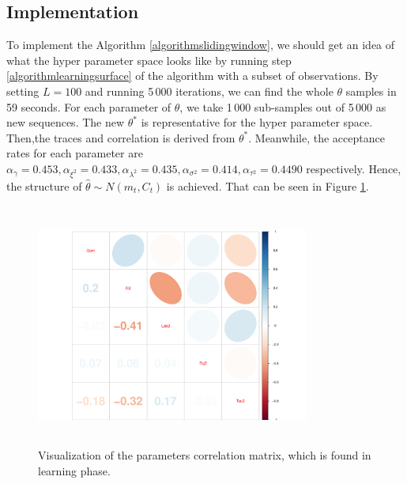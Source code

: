 \subsection{Implementation}

To implement the Algorithm \ref{algorithmslidingwindow}, we should get an idea of what the hyper parameter space looks like by running step \ref{algorithmlearningsurface} of the algorithm with a subset of observations. By setting $L=100$ and running 5\,000 iterations, we can find the whole $\theta$ samples in 59 seconds. For each parameter of $\theta$, we take 1\,000 sub-samples out of 5\,000 as new sequences. The new $\theta^*$ is representative for the hyper parameter space. Then,the traces and correlation is derived from $\theta^*$. Meanwhile, the acceptance rates for each parameter are $\alpha_\gamma = 0.453,\alpha_{\xi^2}=0.433, \alpha_{\lambda^2}=0.435, \alpha_{\sigma^2}=0.414, \alpha_{\tau^2}=0.4490$ respectively. Hence, the structure of  $\hat{\theta}\sim N\left( m_t,C_t\right)$ is achieved. That can be seen in Figure \ref{realdatacorMatrix}. 
\begin{figure}[h]
\centering
\includegraphics[width=0.8\textwidth,height=8cm]{Chapters/05MCMCOU/plots/realdatalearningcorMatrix.pdf}
\caption{Visualization of the parameters correlation matrix, which is found in learning phase. }\label{realdatacorMatrix}
\end{figure}



